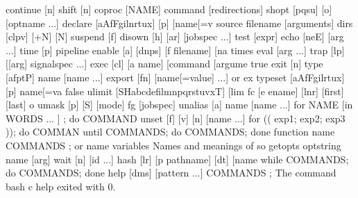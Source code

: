 \documentclass[letterpaper,12pt,english]{sphinxmanual}
\begin{document}
\begin{sphinxVerbatim}[commandchars=\\\{\}]
 continue [n]                            shift [n]
 coproc [NAME] command [redirections]    shopt [\PYGZhy{}pqsu] [\PYGZhy{}o] [optname ...]
 declare [\PYGZhy{}aAfFgilnrtux] [\PYGZhy{}p] [name[=v\PYGZgt{}  source filename [arguments]
 dirs [\PYGZhy{}clpv] [+N] [\PYGZhy{}N]                  suspend [\PYGZhy{}f]
 disown [\PYGZhy{}h] [\PYGZhy{}ar] [jobspec ...]         test [expr]
 echo [\PYGZhy{}neE] [arg ...]                   time [\PYGZhy{}p] pipeline
 enable [\PYGZhy{}a] [\PYGZhy{}dnps] [\PYGZhy{}f filename] [na\PYGZgt{}  times
 eval [arg ...]                          trap [\PYGZhy{}lp] [[arg] signal\PYGZus{}spec ...]
 exec [\PYGZhy{}cl] [\PYGZhy{}a name] [command [argume\PYGZgt{}  true
 exit [n]                                type [\PYGZhy{}afptP] name [name ...]
 export [\PYGZhy{}fn] [name[=value] ...] or ex\PYGZgt{}  typeset [\PYGZhy{}aAfFgilrtux] [\PYGZhy{}p] name[=va\PYGZgt{}
 false                                   ulimit [\PYGZhy{}SHabcdefilmnpqrstuvxT] [lim\PYGZgt{}
 fc [\PYGZhy{}e ename] [\PYGZhy{}lnr] [first] [last] o\PYGZgt{}  umask [\PYGZhy{}p] [\PYGZhy{}S] [mode]
 fg [job\PYGZus{}spec]                           unalias [\PYGZhy{}a] name [name ...]
 for NAME [in WORDS ... ] ; do COMMAND\PYGZgt{}  unset [\PYGZhy{}f] [\PYGZhy{}v] [\PYGZhy{}n] [name ...]
 for (( exp1; exp2; exp3 )); do COMMAN\PYGZgt{}  until COMMANDS; do COMMANDS; done
 function name \PYGZob{} COMMANDS ; \PYGZcb{} or name \PYGZgt{}  variables \PYGZhy{} Names and meanings of so\PYGZgt{}
 getopts optstring name [arg]            wait [\PYGZhy{}n] [id ...]
 hash [\PYGZhy{}lr] [\PYGZhy{}p pathname] [\PYGZhy{}dt] [name \PYGZgt{}  while COMMANDS; do COMMANDS; done
 help [\PYGZhy{}dms] [pattern ...]               \PYGZob{} COMMANDS ; \PYGZcb{}
The command \PYGZdq{}bash \PYGZhy{}c help\PYGZdq{} exited with 0.
\end{sphinxVerbatim}
\end{document}
